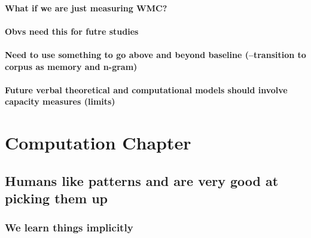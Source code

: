 \documentclass[]{book}
\theoremstyle{definition}
\theoremstyle{definition}
\theoremstyle{definition}
\theoremstyle{remark}
\begin{document}
\hypertarget{what-if-we-are-just-measuring-wmc}{%
\subsubsection{What if we are just measuring
WMC?}\label{what-if-we-are-just-measuring-wmc}}

\hypertarget{obvs-need-this-for-futre-studies}{%
\subsubsection{Obvs need this for futre
studies}\label{obvs-need-this-for-futre-studies}}

\hypertarget{need-to-use-something-to-go-above-and-beyond-baseline-transition-to-corpus-as-memory-and-n-gram}{%
\subsubsection{Need to use something to go above and beyond baseline
(--transition to corpus as memory and
n-gram)}\label{need-to-use-something-to-go-above-and-beyond-baseline-transition-to-corpus-as-memory-and-n-gram}}

\hypertarget{future-verbal-theoretical-and-computational-models-should-involve-capacity-measures-limits}{%
\subsubsection{Future verbal theoretical and computational models should
involve capacity measures
(limits)}\label{future-verbal-theoretical-and-computational-models-should-involve-capacity-measures-limits}}

\hypertarget{computation-chapter}{%
\chapter{Computation Chapter}\label{computation-chapter}}

\hypertarget{humans-like-patterns-and-are-very-good-at-picking-them-up}{%
\section{Humans like patterns and are very good at picking them
up}\label{humans-like-patterns-and-are-very-good-at-picking-them-up}}

\hypertarget{we-learn-things-implicitly}{%
\subsection{We learn things
implicitly}\label{we-learn-things-implicitly}}
\end{document}
